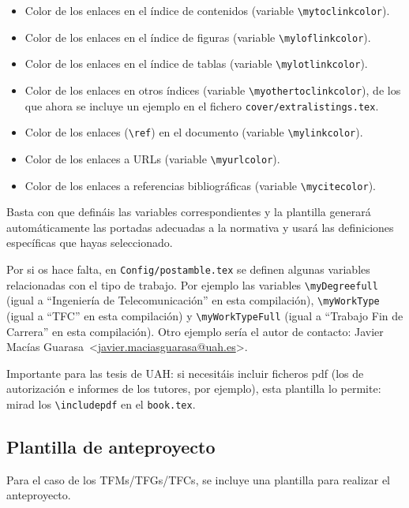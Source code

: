 \documentclass[spanish,openright]{book}
\makeatletter
\newcommand{\myDegree}{GITT}
\newcommand{\myAuthorName}{Javier}
\newcommand{\myAuthorSurname}{Macías Guarasa}
\newcommand{\myAuthorFullName}{\myAuthorName{} \myAuthorSurname{}}
\newcommand{\myAuthorEmail}{javier.maciasguarasa@uah.es}
\newcommand{\myResearchGroup}{GEINTRA}
\newcommand{\myDegreefull}{Ingeniería de Telecomunicación}
\newcommand{\myWorkType}{TFC}
\newcommand{\myWorkTypeFull}{Trabajo Fin de Carrera}
\newcommand{\myWorkTypeFull}{Trabajo Fin de Carrera}
\newcommand{\myDegreefull}{Ingeniería Electrónica}
\newcommand{\myWorkType}{TFC}
\newcommand{\myWorkTypeFull}{Trabajo Fin de Carrera}
\newcommand{\myWorkTypeFull}{Trabajo Fin de Carrera}
\newcommand{\myDegreefull}{Ingeniería Técnica de Telecomunicación, especialidad en Sistemas Electrónicos}
\newcommand{\myWorkType}{TFC}
\newcommand{\myWorkTypeFull}{Trabajo Fin de Carrera}
\newcommand{\myWorkTypeFull}{Trabajo Fin de Carrera}
\newcommand{\myDegreefull}{Ingeniería Técnica de Telecomunicación, especialidad en Sistemas de Telecomunicación}
\newcommand{\myWorkType}{TFC}
\newcommand{\myWorkTypeFull}{Trabajo Fin de Carrera}
\newcommand{\myWorkTypeFull}{Trabajo Fin de Carrera}
\newcommand{\myDegreefull}{Ingeniería Técnica Industrial, especialidad en Electrónica Industrial}
\newcommand{\myWorkType}{TFC}
\newcommand{\myWorkTypeFull}{Trabajo Fin de Carrera}
\newcommand{\myWorkTypeFull}{Trabajo Fin de Carrera}
\newcommand{\myDegreefull}{Grado en Ingeniería Electrónica de Comunicaciones}
\newcommand{\myWorkType}{TFG}
\newcommand{\myWorkTypeFull}{Trabajo Fin de Grado}
\newcommand{\myWorkTypeFull}{Trabajo Fin de Grado}
\newcommand{\myDegreefull}{Grado en Ingeniería en Electrónica y Automática Industrial}
\newcommand{\myWorkType}{TFG}
\newcommand{\myWorkTypeFull}{Trabajo Fin de Grado}
\newcommand{\myWorkTypeFull}{Trabajo Fin de Grado}
\newcommand{\myDegreefull}{Grado en Ingeniería en Sistemas de Telecomunicación}
\newcommand{\myWorkType}{TFG}
\newcommand{\myWorkTypeFull}{Trabajo Fin de Grado}
\newcommand{\myWorkTypeFull}{Trabajo Fin de Grado}
\newcommand{\myDegreefull}{Grado en Ingeniería en Tecnologías de la Telecomunicación}
\newcommand{\myWorkType}{TFG}
\newcommand{\myWorkTypeFull}{Trabajo Fin de Grado}
\newcommand{\myWorkTypeFull}{Trabajo Fin de Grado}
\newcommand{\myDegreefull}{Grado en Ingeniería Telemática}
\newcommand{\myWorkType}{TFG}
\newcommand{\myWorkTypeFull}{Trabajo Fin de Grado}
\newcommand{\myWorkTypeFull}{Trabajo Fin de Grado}
\newcommand{\myDegreefull}{Grado en Ingeniería de Computadores}
\newcommand{\myWorkType}{TFG}
\newcommand{\myWorkTypeFull}{Trabajo Fin de Grado}
\newcommand{\myWorkTypeFull}{Trabajo Fin de Grado}
\newcommand{\myDegreefull}{Grado en Ingeniería Informática}
\newcommand{\myWorkType}{TFG}
\newcommand{\myWorkTypeFull}{Trabajo Fin de Grado}
\newcommand{\myWorkTypeFull}{Trabajo Fin de Grado}
\newcommand{\myDegreefull}{Grado en Sistemas de Información}
\newcommand{\myWorkType}{TFG}
\newcommand{\myWorkTypeFull}{Trabajo Fin de Grado}
\newcommand{\myWorkTypeFull}{Trabajo Fin de Grado}
\newcommand{\myDegreefull}{Máster Universitario en Sistemas Electrónicos Avanzados. Sistemas Inteligentes}
\newcommand{\myWorkType}{TFM}
\newcommand{\myWorkTypeFull}{Trabajo Fin de Máster}
\newcommand{\myWorkTypeFull}{Trabajo Fin de Máster}
\newcommand{\myDegreefull}{Estudios de Doctorado}
\newcommand{\myWorkType}{PHDUAH}
\newcommand{\myWorkTypeFull}{Tesis Doctoral}
\newcommand{\myWorkTypeFull}{Doctoral Thesis}
\newcommand{\myDegreefull}{Doctor Ingeniero de Telecomunicación}
\newcommand{\myWorkType}{PHDUPM}
\newcommand{\myWorkTypeFull}{Tesis Doctoral}
\newcommand{\myWorkTypeFull}{Doctoral Thesis}
\newcommand{\myDegreefull}{GEINTRA Research Report}
\newcommand{\myWorkType}{GEINTRARR}
\newcommand{\myWorkTypeFull}{Informe técnico del Grupo de investigación \myResearchGroup{}}
\newcommand{\myWorkTypeFull}{\myResearchGroup{} Research Report}
\newcommand{\myDegreefull}{Máster Universitario en Ingeniería de Telecomunicación}
\newcommand{\myWorkType}{TFM}
\newcommand{\myWorkTypeFull}{Trabajo Fin de Máster}
\newcommand{\myWorkTypeFull}{Trabajo Fin de Máster}
\newcommand{\myDegreefull}{Máster Universitario en Ingeniería Industrial}
\newcommand{\myWorkType}{TFM}
\newcommand{\myWorkTypeFull}{Trabajo Fin de Máster}
\newcommand{\myWorkTypeFull}{Trabajo Fin de Máster}
\newcommand{\myDegreefull}{Grado en Ingeniería en Tecnologías Industriales}
\newcommand{\myWorkType}{TFG}
\newcommand{\myWorkTypeFull}{Trabajo Fin de Grado}
\newcommand{\myWorkTypeFull}{Trabajo Fin de Grado}
\newcommand{\myDegreefull}{Grado en Ingeniería en Sistemas de Información}
\newcommand{\myWorkType}{TFG}
\newcommand{\myWorkTypeFull}{Trabajo Fin de Grado}
\newcommand{\myWorkTypeFull}{Trabajo Fin de Grado}
\newcommand{\myDegreefull}{Máster Universitario en Ingeniería Electrónica}
\newcommand{\myWorkType}{TFM}
\newcommand{\myWorkTypeFull}{Trabajo Fin de Máster}
\newcommand{\myWorkTypeFull}{Trabajo Fin de Máster}
\newcommand{\myWorkType}{TFG}
\newcommand{\myDegreefull}{ERROR: Defined degree (\myDegree) unknown, check \texttt{config/myconfig.tex}}
\newcommand{\myWorkTypeFull}{ERROR: Defined degree (\myDegree) unknown, check \texttt{config/myconfig.tex}}
\newcommand{\contactauthor}{\myAuthorFullName~\textless\href{mailto:\myAuthorEmail}{\myAuthorEmail}\textgreater}
\makeatother
\begin{document}
\begin{itemize}
\item Color de los enlaces en el índice de contenidos (variable
  \texttt{\textbackslash{}mytoclinkcolor}).
\item Color de los enlaces en el índice de figuras (variable
  \texttt{\textbackslash{}myloflinkcolor}).
\item Color de los enlaces en el índice de tablas (variable
  \texttt{\textbackslash{}mylotlinkcolor}).
\item Color de los enlaces en otros índices (variable
  \texttt{\textbackslash{}myothertoclinkcolor}), de los que ahora se
  incluye un ejemplo en el fichero \texttt{cover/extralistings.tex}.
\item Color de los enlaces (\texttt{\textbackslash{}ref}) en el
  documento (variable \texttt{\textbackslash{}mylinkcolor}).
\item Color de los enlaces a URLs (variable
  \texttt{\textbackslash{}myurlcolor}).
\item Color de los enlaces a referencias bibliográficas (variable
  \texttt{\textbackslash{}mycitecolor}).
\end{itemize}

Basta con que defináis las variables correspondientes y la plantilla
generará automáticamente las portadas adecuadas a la normativa y usará
las definiciones específicas que hayas seleccionado.

Por si os hace falta, en \texttt{Config/postamble.tex} se definen
algunas variables relacionadas con el tipo de trabajo. Por ejemplo las
variables \texttt{\textbackslash{}myDegreefull} (igual a
``\myDegreefull'' en esta compilación),
\texttt{\textbackslash{}myWorkType} (igual a ``\myWorkType'' en
esta compilación) y \texttt{\textbackslash{}myWorkTypeFull} (igual a
``\myWorkTypeFull'' en esta compilación). Otro ejemplo sería el
autor de contacto: \contactauthor.

Importante para las tesis de UAH: si necesitáis incluir ficheros pdf
(los de autorización e informes de los tutores, por ejemplo), esta
plantilla lo permite: mirad los \texttt{\textbackslash{}includepdf} en
el \texttt{book.tex}.

\subsection{Plantilla de anteproyecto}
\label{sec:plantilla-de-anteproyecto}

Para el caso de los TFMs/TFGs/TFCs, se incluye una plantilla para
realizar el anteproyecto.
\end{document}
